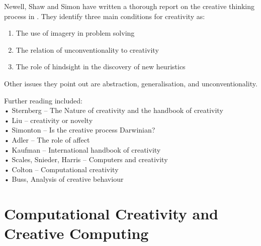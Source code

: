 Newell, Shaw and Simon have written a thorough report on the creative thinking process in \citep{Newell1963}. They identify three main conditions for creativity as:

\begin{enumerate}
  \item The use of imagery in problem solving
  \item The relation of unconventionality to creativity
  \item The role of hindsight in the discovery of new heuristics
\end{enumerate}

Other issues they point out are abstraction, generalisation, and unconventionality.

Further reading included:\\
•	Sternberg – The Nature of creativity and the handbook of creativity \citep{Sternberg1999, Sternberg1999}\\
•	Liu – creativity or novelty \citep{Liu2000}\\
•	Simonton – Is the creative process Darwinian? \citep{Simonton2011}\\
•	Adler – The role of affect \citep{Adler2007}\\
•	Kaufman – International handbook of creativity \citep{Kaufman2006}\\
•	Scales, Snieder, Harris – Computers and creativity \citep{Scales1999}\\
•	Colton – Computational creativity \citep{Colton2008}\\
•	Buss, Analysis of creative behaviour \citep{Buss2011, Zedan2008}

\section{Computational Creativity and Creative Computing}

